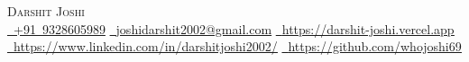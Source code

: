 \begin{center}
  {\Huge\scshape Darshit Joshi} \\ \vspace{2pt}
  \small
  \mbox{\href{tel:+919328605989}{\faPhone*\ +91 9328605989}} \hspace{1em plus 0.5em}
  \mbox{\href{mailto:joshidarshit2002@gmail.com}{\faEnvelope\ \underline{joshidarshit2002@gmail.com}}} \hspace{1em plus 0.5em}
  \mbox{\href{https://darshit-joshi.vercel.app}{\faGlobe\ \underline{https://darshit-joshi.vercel.app}}} \hspace{1em plus 0.5em}
  \mbox{\href{https://www.linkedin.com/in/darshitjoshi2002/}{\faLinkedin\ \underline{https://www.linkedin.com/in/darshitjoshi2002/}}} \hspace{1em plus 0.5em}
  \mbox{\href{https://github.com/whojoshi69}{\faGithub\ \underline{https://github.com/whojoshi69}}}
\end{center}
\vspace{-8pt}
